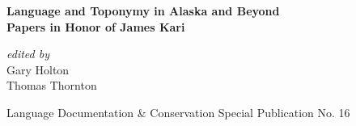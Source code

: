 \begin{titlepage} %

	\raggedleft %

	\vspace*{\baselineskip} %

	\vspace*{0.1\textheight} %


	\textbf{\Huge Language and Toponymy in Alaska and Beyond}\\[\baselineskip]

	\textbf{\LARGE Papers in Honor of James Kari}

	\vspace*{0.15\textheight}

	{\large \textit{edited by}}\\[\baselineskip]
	{\Large
	Gary Holton\\[2pt]
	Thomas Thornton\\[2pt]
	}

	\vfill %

	{\large Language Documentation \& Conservation Special Publication No. 16}

	\vspace*{3\baselineskip} %

\end{titlepage}
